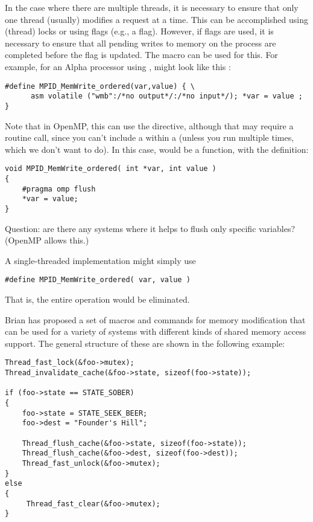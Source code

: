 In the case where there are multiple threads, it is necessary to ensure that
only one thread (usually) modifies a request at a time.  This can be
accomplished using (thread) locks or using flags (e.g., a  flag).
However, if flags are used, it is necessary to ensure that all pending writes
to memory on the process are completed before the flag is updated.  The macro
 can be used for this.  
For example, for an Alpha processor using ,
 might look like this \cite{alpha-asm}:
\begin{verbatim}
#define MPID_MemWrite_ordered(var,value) { \
      asm volatile ("wmb":/*no output*/:/*no input*/); *var = value ; }
\end{verbatim}

Note that in OpenMP, this can use the  directive, although that
may require a routine call, since you can't include a \code{\#pragma} within a
\code{\#define} (unless you run \code{cpp} multiple times, which we don't want
to do).  In this case, \mpidfunc{MPID_MemWrite_ordered} would be a 
function, with the definition:
\begin{verbatim}
void MPID_MemWrite_ordered( int *var, int value )
{
    #pragma omp flush
    *var = value;
}
\end{verbatim}

Question: are there any systems where it helps to flush only
specific variables?  (OpenMP allows this.)

A single-threaded implementation might simply use
\begin{verbatim}
#define MPID_MemWrite_ordered( var, value ) 
\end{verbatim}
That is, the entire operation would be eliminated.

Brian has proposed a set of macros and commands for memory modification that
can be used for a variety of systems with different kinds of shared memory
access support.  The general structure of these are shown in the following
example:

\begin{verbatim}
Thread_fast_lock(&foo->mutex);
Thread_invalidate_cache(&foo->state, sizeof(foo->state));

if (foo->state == STATE_SOBER)
{
    foo->state = STATE_SEEK_BEER;
    foo->dest = "Founder's Hill";

    Thread_flush_cache(&foo->state, sizeof(foo->state));
    Thread_flush_cache(&foo->dest, sizeof(foo->dest));
    Thread_fast_unlock(&foo->mutex);
}
else
{
     Thread_fast_clear(&foo->mutex);
}
\end{verbatim}

